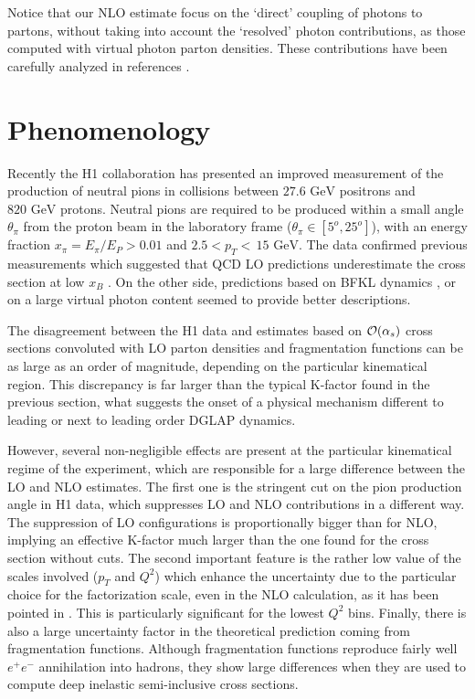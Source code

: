 \documentclass[superscriptaddress,showkeys,showpacs]{revtex4}
\begin{document}
Notice that our NLO estimate focus on the `direct' coupling of photons 
to partons, without taking into account the  `resolved' photon contributions,
as those computed with virtual photon parton densities. These contributions 
have been carefully analyzed in references \cite{aure,Fontannaz:2004ev}. 


\section{Phenomenology}

Recently the H1 \cite{Aktas:2004rb} collaboration has presented an improved 
measurement of the production of neutral pions in collisions between 
$27.6\mbox{ GeV}$  positrons and $820\mbox{ GeV}$ protons. Neutral pions are 
required to be produced within a small angle $\theta_{\pi}$ from the proton 
beam in the laboratory 
frame ($\theta_{\pi} \in[5^o,25^o]$), with an energy fraction 
$x_{\pi}=E_{\pi}/E_P>0.01$ and $2.5<p_T<\,15\mbox{ GeV}$. The data confirmed 
previous measurements which suggested that QCD LO predictions underestimate 
the cross section at low $x_B$ \cite{H1viejo}. On the other side, 
predictions based on BFKL dynamics \cite{BFKL}, or on a large 
virtual photon content \cite{Jung} seemed to provide better descriptions.

The disagreement between the H1 data and estimates based on  
${\cal{O}}(\alpha_s)$ 
cross sections convoluted with LO parton densities and fragmentation 
functions can be as large as an order of magnitude, depending on the 
particular kinematical region. This discrepancy is far larger than the 
typical K-factor found in the previous section, what suggests the onset of 
a physical mechanism different to leading or next to leading order 
DGLAP dynamics. 

However, several non-negligible effects are present at the particular 
kinematical regime of the experiment, which are responsible for a large 
difference between the LO and NLO estimates. The first one is the
stringent cut on the pion production angle in H1 data, which suppresses LO 
and NLO contributions in a  different way. The  
suppression of LO configurations is proportionally bigger than for NLO,
 implying an 
effective K-factor much  larger than the one found for the cross 
section without cuts.
The second important feature is the rather low value of the scales involved 
($p_T$ and $Q^2$) which enhance the uncertainty due to the 
particular choice for the factorization scale, even in the NLO calculation, 
as it has been pointed in \cite{aure}. 
This is particularly significant for the lowest $Q^2$ bins.
Finally, there is also a large uncertainty 
factor in the theoretical prediction coming from fragmentation functions. 
Although fragmentation functions reproduce fairly well $e^+e^-$ annihilation 
into hadrons, they show large differences when they are used to compute deep inelastic semi-inclusive cross sections.
\end{document}
